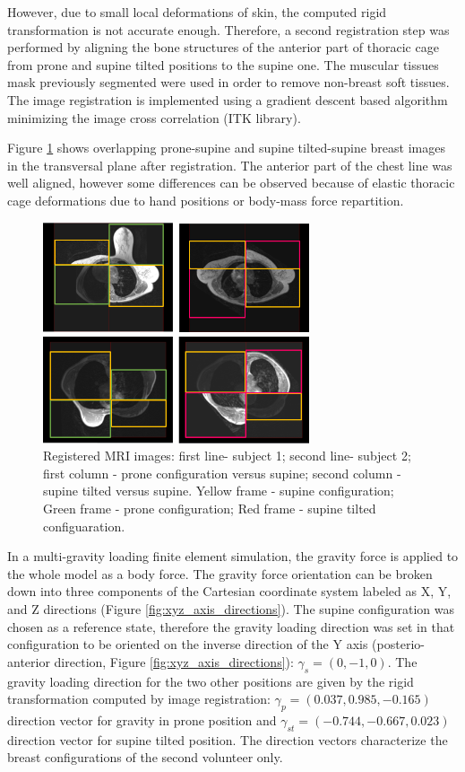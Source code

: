 However, due to small local deformations of skin, the computed rigid transformation is not accurate enough. Therefore, a second registration step was performed by aligning the bone structures of the anterior part of thoracic cage from prone and supine tilted positions to the supine one. The muscular tissues mask previously segmented were used in order to remove non-breast soft tissues. The image registration is implemented using a gradient descent based algorithm minimizing the image cross correlation (ITK library).

Figure \ref{fig:patientdataregistered} shows overlapping  prone-supine and supine tilted-supine breast images in the transversal plane after registration. The anterior part of the chest line was well aligned, however some differences can be observed because of elastic thoracic cage deformations due to hand positions or body-mass force repartition. 

\begin{figure}[!h]
\centering
\includegraphics[width=0.7\textwidth,keepaspectratio]{figures/patientDataRegistered.png} 
\caption{Registered MRI images: first line- subject 1; second line- subject 2; first column - prone configuration versus supine; second column - supine tilted versus supine. Yellow frame - supine configuration; Green frame - prone configuration; Red frame - supine tilted configuaration.}\label{fig:patientdataregistered}
\end{figure}

In a multi-gravity loading finite element simulation, the gravity force is applied to the whole model as a body force. The gravity force orientation can be broken down into three components of the Cartesian coordinate system labeled as X, Y, and Z directions (Figure \ref{fig:xyz_axis_directions}). The supine configuration was chosen as a reference state, therefore the gravity loading direction was set in that configuration to be oriented on the inverse direction of the Y axis (posterio-anterior direction, Figure \ref{fig:xyz_axis_directions}): $\gamma_s = (0,-1,0)$.   The gravity loading direction for the two other positions are given by the rigid transformation computed by image registration: $\gamma_p = (0.037, 0.985, -0.165)$ direction vector for gravity in prone position and $\gamma_{st} = (-0.744 , -0.667, 0.023)$ direction vector for supine tilted position. The direction vectors characterize the breast configurations of the second volunteer only.

